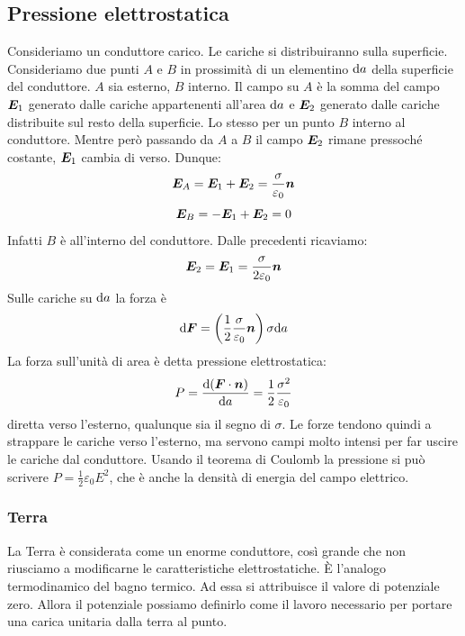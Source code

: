 \subsection{Pressione elettrostatica}
Consideriamo un conduttore carico. Le cariche si distribuiranno sulla superficie. Consideriamo due punti $A$ e $B$ in prossimità di un elementino $\mathrm{d} a$ della superficie del conduttore. $A$ sia esterno, $B$ interno. Il campo su $A$ è la somma del campo $\boldsymbol{E}_1$ generato dalle cariche appartenenti all'area $\mathrm{d} a$ e $\boldsymbol{E}_2$ generato dalle cariche distribuite sul resto della superficie. Lo stesso per un punto $B$ interno al conduttore. Mentre però passando da $A$ a $B$ il campo $\boldsymbol{E}_2$ rimane pressoché costante, $\boldsymbol{E}_1$ cambia di verso. Dunque:
\[\boldsymbol{E}_A=\boldsymbol{E}_1+\boldsymbol{E}_2=\frac{\sigma}{\varepsilon_0}\boldsymbol{n}\]
\[\boldsymbol{E}_B=-\boldsymbol{E}_1+\boldsymbol{E}_2=0\]
Infatti $B$ è all'interno del conduttore. Dalle precedenti ricaviamo:
\[\boldsymbol{E}_2=\boldsymbol{E}_1=\frac{\sigma}{2\varepsilon_0}\boldsymbol{n}\]
Sulle cariche su $\mathrm{d} a$ la forza è
\[\mathrm{d} \boldsymbol{F}=\left(\frac{1}{2}\frac{\sigma}{\varepsilon_0}\boldsymbol{n}\right)\sigma\mathrm{d} a\]
La forza sull'unità di area è detta pressione elettrostatica:
\begin{equation}
  P=\frac{\mathrm{d}(\boldsymbol{F}\cdot \boldsymbol{n})}{\mathrm{d} a}=\frac{1}{2}\frac{\sigma^2}{\varepsilon_0}
\end{equation}
diretta verso l'esterno, qualunque sia il segno di $\sigma$. Le forze tendono quindi a strappare le cariche verso l'esterno, ma servono campi molto intensi per far uscire le cariche dal conduttore. Usando il teorema di Coulomb la pressione si può scrivere $P=\frac{1}{2}\varepsilon_0E^2$, che è anche la densità di energia del campo elettrico.
\subsubsection{Terra}
\label{potenziale_terra}
La Terra è considerata come un enorme conduttore, così grande che non riusciamo a modificarne le caratteristiche elettrostatiche. \`E l'analogo termodinamico del bagno termico. Ad essa si attribuisce il valore di potenziale zero. Allora il potenziale possiamo definirlo come il lavoro necessario per portare una carica unitaria dalla terra al punto.
